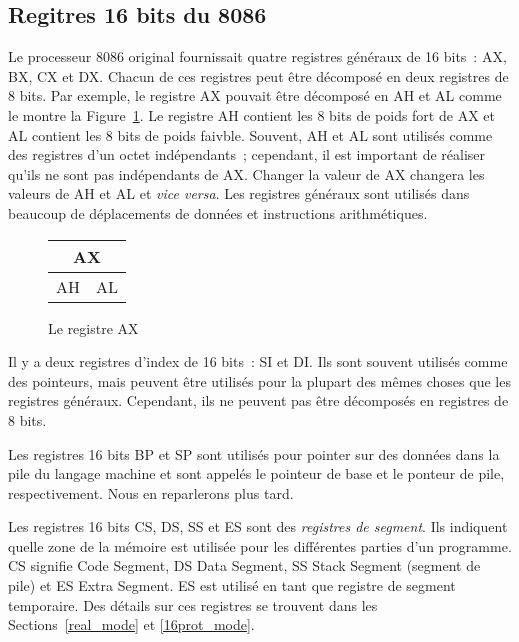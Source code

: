 \subsection{Regitres 16 bits du 8086}

Le processeur 8086 original fournissait quatre registres généraux de 16 bits~:
AX, BX, CX et DX. Chacun de ces registres peut être décomposé en deux
registres de 8 bits. Par exemple, le registre AX pouvait être décomposé
en AH et AL comme le montre la  Figure~\ref{fig:AX_reg}. Le registre
AH contient les 8 bits de poids fort de AX et AL contient les 8 bits
de poids faivble. Souvent, AH et AL sont utilisés comme des registres
d'un octet indépendants~; cependant, il est important de réaliser qu'ils ne
sont pas indépendants de AX. Changer la valeur de AX changera les valeurs
de AH et AL et {\em vice versa}\/. Les registres généraux sont utilisés dans
beaucoup de déplacements de données et instructions arithmétiques.

\begin{figure}
\begin{center}
\begin{tabular}{cc}
\multicolumn{2}{c}{AX} \\
\hline
\multicolumn{1}{||c|}{AH} & \multicolumn{1}{c||}{AL} \\
\hline
\end{tabular}
\caption{Le registre AX\label{fig:AX_reg} }
\end{center}
\end{figure}

Il y a deux registres d'index  de 16 bits~: SI et DI. Ils sont souvent utilisés
comme des pointeurs, mais peuvent être utilisés pour la plupart des mêmes choses
que les registres généraux. Cependant, ils ne peuvent pas être décomposés
en registres de 8 bits.

Les registres 16 bits BP et SP sont utilisés pour pointer sur des données dans
la pile du langage machine et sont appelés le pointeur de base 
et le ponteur de pile, respectivement. Nous en reparlerons plus tard.

Les registres 16 bits CS, DS, SS et ES sont des \emph{registres de segment}.  Ils
indiquent quelle zone de la mémoire est utilisée pour les différentes parties
d'un programme. CS signifie Code Segment, DS Data Segment, SS Stack Segment (segment
de pile) et ES Extra Segment. ES est utilisé en tant que registre de segment
temporaire. Des détails sur ces registres se trouvent dans les Sections~\ref{real_mode}
et \ref{16prot_mode}.

